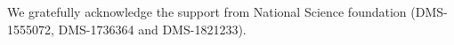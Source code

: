 %
%



\begin{acknowledgements}
We gratefully acknowledge the support from National Science foundation (DMS-1555072, DMS-1736364 and DMS-1821233).
\end{acknowledgements}




